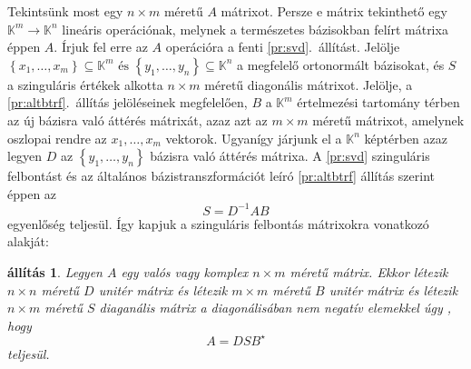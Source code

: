 \documentclass[a4paper, showtrims]{memoir}
\theoremstyle{plain}
\newtheorem{proposition}{állítás}[chapter]
\theoremstyle{remark}
\theoremstyle{definition}
\begin{document}
Tekintsünk most egy $n\times m$ méretű $A$ mátrixot.
Persze e mátrix tekinthető egy $\mathbb{K}^m\to\mathbb{K}^n$ lineáris operációnak,
melynek a természetes bázisokban felírt mátrixa éppen $A$.
Írjuk fel erre az $A$ operációra a fenti \ref{pr:svd}.~állítást.
Jelölje 
    \(
    \left\{ x_1,\dots,x_m \right\}\subseteq \mathbb{K}^m
        \text{ és }
        \left\{ y_1,\dots,y_n \right\}\subseteq \mathbb{K}^n
    \)
a megfelelő ortonormált bázisokat, és 
\(
S
\)
a szinguláris értékek alkotta 
$n\times m$
méretű diagonális mátrixot.
Jelölje, 
a \ref{pr:altbtrf}.~állítás jelöléseinek megfelelően,
$B$ a $\mathbb{K}^m$ értelmezési tartomány térben az új bázisra való áttérés mátrixát,
azaz azt az $m\times m$ méretű mátrixot, 
amelynek oszlopai rendre az $x_1,\dots,x_m$ vektorok.
Ugyanígy járjunk el a $\mathbb{K}^n$ képtérben azaz legyen $D$ az $\left\{ y_1,\dots,y_n \right\}$ bázisra való áttérés mátrixa.
A \ref{pr:svd} szinguláris felbontást és az általános bázistranszformációt leíró \ref{pr:altbtrf} állítás szerint éppen az
\[
    S=D^{-1}AB
\]
egyenlőség teljesül.
Így kapjuk a szinguláris felbontás mátrixokra vonatkozó alakját:
\begin{proposition}
    Legyen $A$ egy valós vagy komplex $n\times m$ méretű mátrix.
    Ekkor létezik $n\times n$ méretű $D$ unitér mátrix és 
    létezik $m\times m$ méretű $B$ unitér mátrix és 
    létezik $n\times m$ méretű $S$ diaganális mátrix a diagonálisában nem negatív elemekkel úgy
    , hogy 
    \[
        A=DSB^\star
    \]
    teljesül.
\end{proposition}
\end{document}
